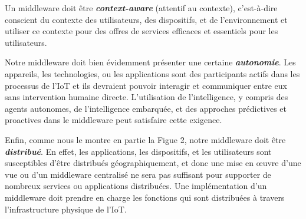 Un middleware doit être \textbf{\textit{context-aware}} (attentif au contexte), c'est-à-dire conscient du contexte des utilisateurs, des dispositifs, et de l’environnement et utiliser ce contexte pour des offres de services efficaces et essentiels pour les utilisateurs.

Notre middleware doit bien évidemment présenter une certaine \textbf{\textit{autonomie}}. Les appareils, les technologies, ou les applications sont des participants actifs dans les processus de l'IoT et ils devraient pouvoir interagir et communiquer entre eux sans intervention humaine directe. L'utilisation de l'intelligence, y compris des agents autonomes, de l’intelligence embarquée, et des approches prédictives et proactives dans le middleware peut satisfaire cette exigence.

Enfin, comme nous le montre en partie la Figue 2, notre middleware doit être \textbf{\textit{distribué}}. En effet, les applications, les dispositifs, et les utilisateurs sont susceptibles d'être distribués géographiquement, et donc une mise en œuvre d’une vue ou d’un middleware centralisé ne sera pas suffisant pour supporter de nombreux services ou applications distribuées. Une implémentation d'un middleware doit prendre en charge les fonctions qui sont distribuées à travers l'infrastructure physique de l'IoT.